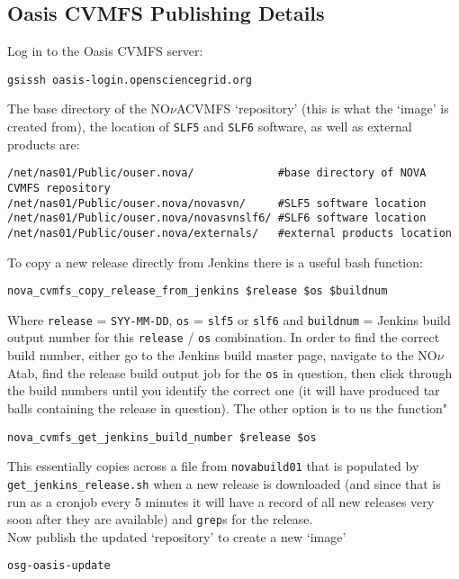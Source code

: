 \documentclass[letterpaper,10pt]{article}
\newcommand{\nova}{NO$\nu$A}
\newcommand{\novas}{\nova \space}
\begin{document}
\subsection{Oasis CVMFS Publishing Details}

Log in to the Oasis CVMFS server:

\begin{verbatim}
gsissh oasis-login.opensciencegrid.org
\end{verbatim}
\noindent
The base directory of the \novas CVMFS `repository' (this is what the `image' is created from), the location of \verb|SLF5| and \verb|SLF6| software, as well as external products are:

\begin{verbatim}
/net/nas01/Public/ouser.nova/             #base directory of NOVA CVMFS repository
/net/nas01/Public/ouser.nova/novasvn/     #SLF5 software location
/net/nas01/Public/ouser.nova/novasvnslf6/ #SLF6 software location
/net/nas01/Public/ouser.nova/externals/   #external products location
\end{verbatim}
\noindent
To copy a new release directly from Jenkins there is a useful bash function:
\begin{verbatim}
nova_cvmfs_copy_release_from_jenkins $release $os $buildnum
\end{verbatim}
Where \verb|release| = \verb|SYY-MM-DD|, \verb|os| = \verb|slf5| or \verb|slf6| and \verb|buildnum| = Jenkins build output number for this \verb|release| / \verb|os| combination.
\noindent
In order to find the correct build number, either go to the Jenkins build master page, navigate to the \novas tab, find the release build output job for the \verb|os| in question, then click through the build numbers until you identify the correct one (it will have produced tar balls containing the release in question).
\noindent
The other option is to us the function"
\begin{verbatim}
nova_cvmfs_get_jenkins_build_number $release $os
\end{verbatim}
\noindent
This essentially copies across a file from \verb|novabuild01| that is populated by \verb|get_jenkins_release.sh| when a new release is downloaded (and since that is run as a cronjob every 5 minutes it will have a record of all new releases very soon after they are available) and \verb|grep|s for the release.\\

Now publish the updated `repository' to create a new `image'

\begin{verbatim}
osg-oasis-update
\end{verbatim}
\end{document}
